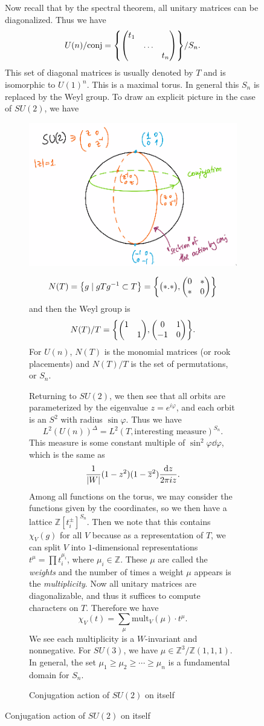 \documentclass[leqno, openany]{memoir}
\theoremstyle{definition}
\theoremstyle{remark}
\theoremstyle{plain}
\theoremstyle{definition}
\theoremstyle{remark}
\newcommand{\Z}{\mathbb{Z}}
\newcommand{\ol}[1]{\overline{#1}}
\begin{document}
\begin{figure}[H]
Now recall that by the spectral theorem, all unitary matrices can be
diagonalized. Thus we have \[ U(n) / \text{conj} = \qty{ \mqty(\dmat{t_1,
\ldots, t_n}) } / S_n. \] This set of diagonal matrices is usually denoted by
$T$ and is isomorphic to $U(1)^n$. This is a maximal torus. In general this
$S_n$ is replaced by the Weyl group. To draw an explicit picture in the case of
$SU(2)$, we have \begin{figure}[H] \centering
    \includegraphics[scale=0.8]{su2conj.png} \caption{Conjugation action of
    $SU(2)$ on itself}%
    \[ N(T) = \qty{g \mid gTg^{-1} \subset T} = \qty{ \mqty( \dmat{*.*} ),
    \mqty( 0 & * \\ * & 0 ) } \] and then the Weyl group is \[ N(T) / T = \qty{
    \mqty( \dmat{1,1} ), \mqty(0 & 1 \\ -1 & 0) }. \] For $U(n)$, $N(T)$ is the
    monomial matrices (or rook placements) and $N(T)/T$ is the set of
    permutations, or $S_n$.

Returning to $SU(2)$, we then see that all orbits are parameterized by the
eigenvalue $z = e^{i \varphi}$, and each orbit is an $S^2$ with radius $\sin
\varphi$. Thus we have \[ L^2(U(n))^{\Delta} = L^2(T, \text{interesting
measure})^{S_n}. \] This measure is some constant multiple of $\sin^2 \varphi
\dd{\varphi}$, which is the same as \[ \frac{1}{\abs{W}} (1-z^2)(1- \ol{z}^2)
\frac{\dd{z}}{2 \pi i z}. \] Among all functions on the torus, we may consider
the functions given by the coordinates, so we then have a lattice
$\Z[t_i^{\pm}]^{S_n}$. Then we note that this contains $\chi_V(g)$ for all $V$
because as a representation of $T$, we can split $V$ into $1$-dimensional
representations $t^{\mu} = \prod t_i^{\mu_i}$, where $\mu_i \in \Z$. These
$\mu$ are called the \textit{weights} and the number of times a weight $\mu$
appears is the \textit{multiplicity}. Now all unitary matrices are
diagonalizable, and thus it suffices to compute characters on $T$. Therefore we
have \[ \chi_V(t) = \sum_{\mu} \text{mult}_V(\mu) \cdot t^{\mu}. \] We see each
multiplicity is a $W$-invariant and nonnegative. For $SU(3)$, we have $\mu \in
\Z^3 / \Z(1,1,1)$. In general, the set $\mu_1 \geq \mu_2 \geq \cdots \geq
\mu_n$ is a fundamental domain for $S_n$.


\end{figure}
\end{figure}
\end{document}

